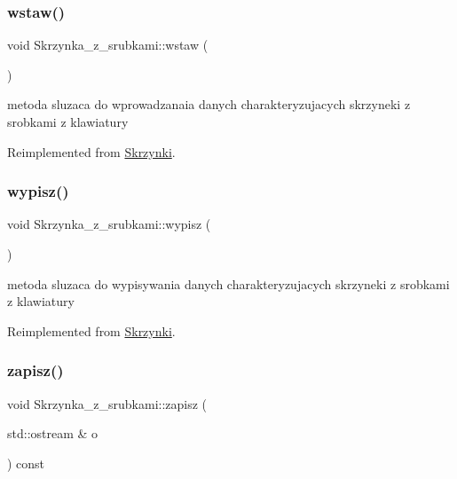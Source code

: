 \subsubsection{\texorpdfstring{wstaw()}{wstaw()}}
{\footnotesize\ttfamily void Skrzynka\+\_\+z\+\_\+srubkami\+::wstaw (\begin{DoxyParamCaption}{ }\end{DoxyParamCaption})\hspace{0.3cm}{\ttfamily [virtual]}}

metoda sluzaca do wprowadzanaia danych charakteryzujacych skrzyneki z srobkami z klawiatury 

Reimplemented from \mbox{\hyperlink{class_skrzynki_a764d5064b25a294b3309dc5077a77921}{Skrzynki}}.

\mbox{\label{class_skrzynka__z__srubkami_ac543a438ce88bc79a9e8a398b6beff7c}} 
\subsubsection{\texorpdfstring{wypisz()}{wypisz()}}
{\footnotesize\ttfamily void Skrzynka\+\_\+z\+\_\+srubkami\+::wypisz (\begin{DoxyParamCaption}{ }\end{DoxyParamCaption})\hspace{0.3cm}{\ttfamily [virtual]}}

metoda sluzaca do wypisywania danych charakteryzujacych skrzyneki z srobkami z klawiatury 

Reimplemented from \mbox{\hyperlink{class_skrzynki_adcf60a88ed78fba5a2dfdb54fa82b236}{Skrzynki}}.

\mbox{\label{class_skrzynka__z__srubkami_a62ccdf02cb9d364630ebea27ea94f2a3}} 
\subsubsection{\texorpdfstring{zapisz()}{zapisz()}}
{\footnotesize\ttfamily void Skrzynka\+\_\+z\+\_\+srubkami\+::zapisz (\begin{DoxyParamCaption}\item[{std\+::ostream \&}]{o }\end{DoxyParamCaption}) const\hspace{0.3cm}{\ttfamily [virtual]}}

